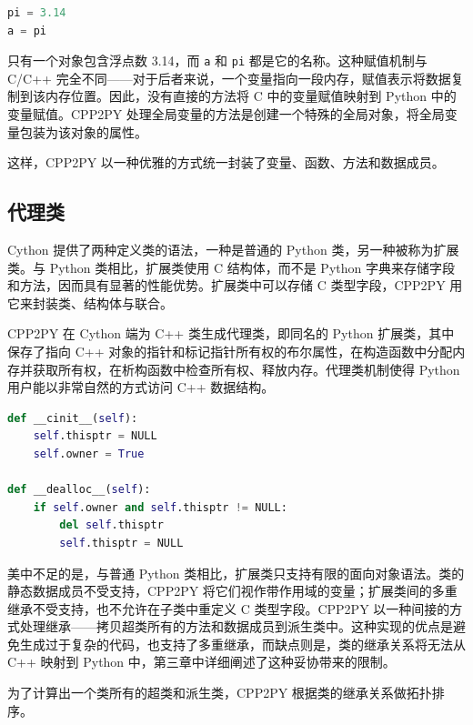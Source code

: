 \begin{framed}
\begin{lstlisting}[language=python]
pi = 3.14
a = pi
\end{lstlisting}
\end{framed}

\noindent 只有一个对象包含浮点数 3.14，而 \lstinline{a} 和 \lstinline{pi} 都是它的名称。这种赋值机制与 C/C++ 完全不同——对于后者来说，一个变量指向一段内存，赋值表示将数据复制到该内存位置。因此，没有直接的方法将 C 中的变量赋值映射到 Python 中的变量赋值。CPP2PY 处理全局变量的方法是创建一个特殊的全局对象，将全局变量包装为该对象的属性。

这样，CPP2PY 以一种优雅的方式统一封装了变量、函数、方法和数据成员。

\subsection{代理类}

Cython 提供了两种定义类的语法，一种是普通的 Python 类，另一种被称为扩展类。与 Python 类相比，扩展类使用 C 结构体，而不是 Python 字典来存储字段和方法，因而具有显著的性能优势。扩展类中可以存储 C 类型字段，CPP2PY 用它来封装类、结构体与联合。

CPP2PY 在 Cython 端为 C++ 类生成代理类，即同名的 Python 扩展类，其中保存了指向 C++ 对象的指针和标记指针所有权的布尔属性，在构造函数中分配内存并获取所有权，在析构函数中检查所有权、释放内存。代理类机制使得 Python 用户能以非常自然的方式访问 C++ 数据结构。

\begin{framed}
\begin{lstlisting}[language=Python]
def __cinit__(self):
    self.thisptr = NULL
    self.owner = True

def __dealloc__(self):
    if self.owner and self.thisptr != NULL:
        del self.thisptr
        self.thisptr = NULL
\end{lstlisting}
\end{framed}

美中不足的是，与普通 Python 类相比，扩展类只支持有限的面向对象语法。类的静态数据成员不受支持，CPP2PY 将它们视作带作用域的变量；扩展类间的多重继承不受支持，也不允许在子类中重定义 C 类型字段。CPP2PY 以一种间接的方式处理继承——拷贝超类所有的方法和数据成员到派生类中。这种实现的优点是避免生成过于复杂的代码，也支持了多重继承，而缺点则是，类的继承关系将无法从 C++ 映射到 Python 中，第三章中详细阐述了这种妥协带来的限制。

为了计算出一个类所有的超类和派生类，CPP2PY 根据类的继承关系做拓扑排序。

